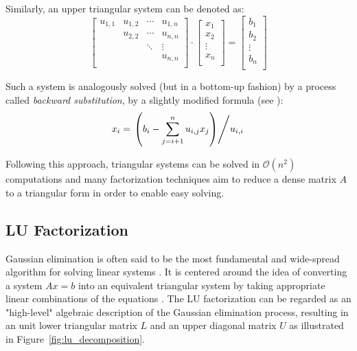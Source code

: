 \noindent Similarly, an upper triangular system can be denoted as:
\begin{equation}
  \left[
    \begin{array}{cccc}
      u_{1,1} & u_{1,2} & \cdots & u_{1,n} \\
      & u_{2,2} & \cdots & u_{n,n} \\
      &  & \ddots & \vdots \\
      & & & u_{n,n}\\
    \end{array}
  \right] \cdot
  \left[
    \begin{array}{c}
      x_{1} \\
      x_{2} \\
      \vdots \\
      x_{n}  \\
    \end{array}
  \right] = 
  \left[
    \begin{array}{c}
      b_{1} \\
      b_{2} \\
      \vdots \\
      b_{n}  \\
    \end{array}
  \right] 
\end{equation}

\noindent Such a system is analogously solved (but in a bottom-up fashion) by a process called \textit{backward substitution}, by a slightly modified formula (see \cite{golub_matrix_2013}):
\begin{equation}
    x_i=\left. \left( b_i-\sum_{j=i+1}^{n}u_{i,j}x_j\right) \middle/ u_{i,i} \right.
\end{equation}

\noindent Following this approach, triangular systems can be solved in $\mathcal{O}(n^2)$ computations and many factorization techniques aim to reduce a dense matrix $A$ to a triangular form in order to enable easy solving.

\subsection{LU Factorization}
\label{sec:lu_factorization}
Gaussian elimination is often said to be the most fundamental and wide-spread algorithm for solving linear systems \cite{greenbaum_iterative_1997}. It is centered around the idea of converting a system $Ax=b$ into an equivalent triangular system by taking appropriate linear combinations of the equations \cite{golub_matrix_2013}. The LU factorization can be regarded as an "high-level" algebraic description of the Gaussian elimination process, resulting in an unit lower triangular matrix $L$ and an upper diagonal matrix $U$ as illustrated in Figure~\hyperref[fig:lu_decomposition]{\ref{fig:lu_decomposition}}. 


